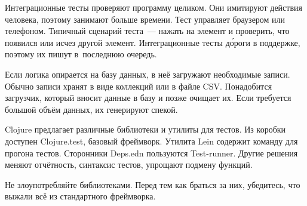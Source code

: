 Интеграционные тесты проверяют программу целиком. Они имитируют действия
человека, поэтому занимают больше времени. Тест управляет браузером или
телефоном. Типичный сценарий теста~--- нажать на элемент и проверить, что
появился или исчез другой элемент. Интеграционные тесты д\'{о}роги в поддержке,
поэтому их пишут в~последнюю очередь.

Если логика опирается на базу данных, в неё загружают необходимые записи. Обычно
записи хранят в виде коллекций или в файле CSV. Понадобится загрузчик, который
вносит данные в базу и позже очищает их. Если требуется большой объём данных, их
генерируют спекой.

Clojure предлагает различные библиотеки и утилиты для тестов. Из коробки
доступен Clojure.test, базовый фреймворк. Утилита Lein содержит команду для
прогона тестов. Сторонники Deps.edn пользуются Test-runner. Другие решения
меняют отчётность, синтаксис тестов, упрощают подмену функций.

Не злоупотребляйте библиотеками. Перед тем как браться за них, убедитесь, что
выжали всё из стандартного фреймворка.
